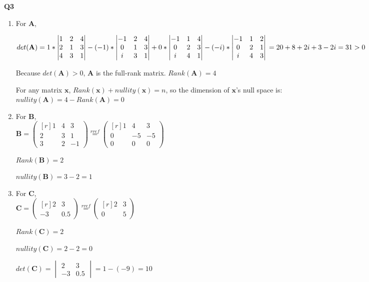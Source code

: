 \documentclass[a4paper,fleqn]{article}
\newcommand{\newvec}[1]{
    \begin{pmatrix*}[r]
        #1
    \end{pmatrix*}
}
\newcommand{\newdet}[1]{
    \begin{vmatrix}
        #1
    \end{vmatrix}
}
\begin{document}
    \newpage 
    \Large{\textbf{Q3}}
    \begin{enumerate}
        \item For $\mathbf{A}$, 
        
        $det{(\mathbf{A})} = 1*\newdet{1&2&4\\2&1&3\\4&3&1}-(-1)*\newdet{-1&2&4\\0&1&3\\i&3&1}+0*\newdet{-1&1&4\\0&2&3\\i&4&1}-(-i)*\newdet{-1&1&2\\0&2&1\\i&4&3}\\
        =20+8+2i+3-2i
        =31 > 0$

        \vspace{0.5cm}
        Because $det(\mathbf{A})>0$, $\mathbf{A}$ is the full-rank matrix. $Rank(\mathbf{A}) = 4$
        
        For any matrix $\mathbf{x}$, $Rank(\mathbf{x})+nullity(\mathbf{x})=n$, so the dimension of $\mathbf{x}$'s null space is: \\
        $nullity(\mathbf{A})=4-Rank(\mathbf{A})=0$
        
        \item For $\mathbf{B}$, \\
        $\mathbf{B}=\newvec{1&4&3\\2&3&1\\3&2&-1} \stackrel{rref}{=}\newvec{1&4&3\\0&-5&-5\\0&0&0}$ 

        $Rank(\mathbf{B}) = 2$ 

        $nullity(\mathbf{B}) = 3 - 2 =1$

        \item For $\mathbf{C}$, \\
        $\mathbf{C} = \newvec{2&3\\-3&0.5} \stackrel{rref}{=}\newvec{2&3\\0&5}$

        \vspace{0.5cm}
        $Rank(\mathbf{C})=2$

        \vspace{0.5cm}
        $nullity(\mathbf{C}) = 2 - 2 =0$

        \vspace{0.5cm}
        $det(\mathbf{C})=\newdet{2&3\\-3&0.5}=1-(-9)=10$


\end{enumerate}
\end{document}
